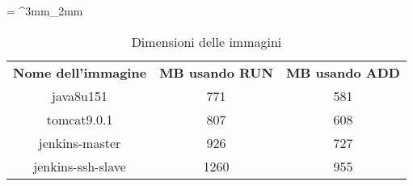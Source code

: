 \tabulinesep = ^3mm_2mm
\begin{longtabu} to \textwidth {ccc}
    \caption[Dimensioni delle immagini]{Dimensioni delle immagini}
    \label{tab:dim}
    \endlastfoot
    \rowfont{\bfseries\sffamily\leavevmode\color{white}}
    \textbf{Nome dell'immagine} & \textbf{MB usando RUN} & \textbf{MB usando ADD} \\
    java8u151 & 771 & 581\\ %
    tomcat9.0.1 & 807 & 608\\ %
    jenkins-master & 926 & 727\\ %
    jenkins-ssh-slave & 1260 & 955\\ %
   
\end{longtabu}